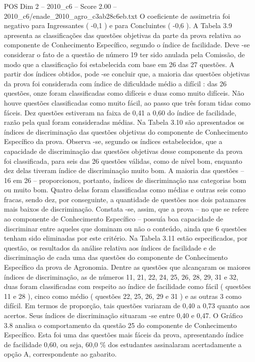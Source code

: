\begin{textsample}{POS Dim 2 – 2010\_c6 – Score 2.00 – 2010\_c6/enade\_2010\_agro\_c3ab28c6eb.txt}
O coeficiente de assimetria foi negativo para Ingressantes ( -0,1 ) e para Concluintes ( -0,6 ).
A Tabela 3.9 apresenta as classificações das questões objetivas da parte da prova relativa ao componente de Conhecimento Específico, segundo o índice de facilidade.
Deve -se considerar o fato de a questão de número 19 ter sido anulada pela Comissão, de modo que a classificação foi estabelecida com base em 26 das 27 questões.
A partir dos índices obtidos, pode -se concluir que, a maioria das questões objetivas da prova foi considerada com índice de dificuldade médio a difícil : das 26 questões, onze foram classificadas como difíceis e duas como muito difíceis.
Não houve questões classificadas como muito fácil, ao passo que três foram tidas como fáceis.
Dez questões estiveram na faixa de 0,41 a 0,60 do índice de facilidade, razão pela qual foram consideradas médias.
Na Tabela 3.10 são apresentados os índices de discriminação das questões objetivas do componente de Conhecimento Específico da prova.
Observa -se, segundo os índices estabelecidos, que a capacidade de discriminação das questões objetivas desse componente da prova foi classificada, para seis das 26 questões válidas, como de nível bom, enquanto dez delas tiveram índice de discriminação muito bom.
A maioria das questões – 16 em 26 – proporcionou, portanto, índices de discriminação nas categorias bom ou muito bom.
Quatro delas foram classificadas como médias e outras seis como fracas, sendo dez, por conseguinte, a quantidade de questões nos dois patamares mais baixos de discriminação.
Constata -se, assim, que a prova – no que se refere ao componente de Conhecimento Específico – possuía boa capacidade de discriminar entre aqueles que dominam ou não o conteúdo, ainda que 6 questões tenham sido eliminadas por este critério.
Na Tabela 3.11 estão especificados, por questão, os resultados da análise relativa aos índices de facilidade e de discriminação de cada uma das questões do componente de Conhecimento Específico da prova de Agronomia.
Dentre as questões que alcançaram os maiores índices de discriminação, as de números 11, 21, 22, 24, 25, 26, 28, 29, 31 e 32, duas foram classificadas com respeito ao índice de facilidade como fácil ( questões 11 e 28 ), cinco como médio ( questões 22, 25, 26, 29 e 31 ) e as outras 3 como difícil.
Em termos de proporção, tais questões variaram de 0,40 a 0,73 quanto aos acertos.
Seus índices de discriminação situaram -se entre 0,40 e 0,47.
O Gráfico 3.8 analisa o comportamento da questão 25 do componente de Conhecimento Específico.
Esta foi uma das questões mais fáceis da prova, apresentando índice de facilidade 0,60, ou seja, 60,0 \% dos estudantes assinalaram acertadamente a opção A, correspondente ao gabarito.

\end{textsample}
